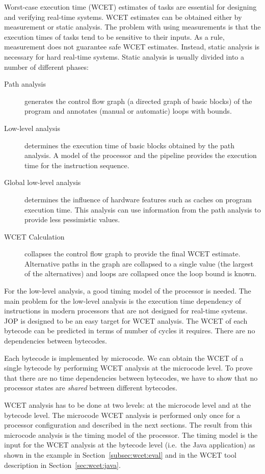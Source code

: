 Worst-case execution time (WCET) estimates of tasks are essential
for designing and verifying real-time systems. WCET estimates can be
obtained either by measurement or static analysis. The problem with
using measurements is that the execution times of tasks tend to be
sensitive to their inputs. As a rule, measurement does not guarantee
safe WCET estimates. Instead, static analysis is necessary for hard
real-time systems. Static analysis is usually divided into a number
of different phases:
\begin{description}
    \item[Path analysis] generates the control flow graph (a directed
    graph of basic blocks) of the program and annotates (manual or
    automatic) loops with bounds.
    \item[Low-level analysis] determines the execution time of basic
    blocks obtained by the path analysis. A model of the processor
    and the pipeline provides the execution time for the instruction
    sequence.
    \item[Global low-level analysis] determines the influence of
    hardware features such as caches on program execution time. This
    analysis can use information from the path analysis to provide less
    pessimistic values.
    \item[WCET Calculation] collapses the control flow graph to
    provide the final WCET estimate. Alternative paths in the graph
    are collapsed to a single value (the largest of the alternatives)
    and loops are collapsed once the loop bound is known.
\end{description}

For the low-level analysis, a good timing model of the processor is
needed. The main problem for the low-level analysis is the execution
time dependency of instructions in modern processors that are not
designed for real-time systems. JOP is designed to be an easy target
for WCET analysis. The WCET of each bytecode can be predicted in
terms of number of cycles it requires. There are no dependencies
between bytecodes.

Each bytecode is implemented by microcode. We can obtain the WCET of
a single bytecode by performing WCET analysis at the microcode
level. To prove that there are no time dependencies between
bytecodes, we have to show that no processor states are
\emph{shared} between different bytecodes.

WCET analysis has to be done at two levels: at the microcode level
and at the bytecode level. The microcode WCET analysis is performed
only once for a processor configuration and described in the next
sections. The result from this microcode analysis is the timing
model of the  processor. The timing model is the input for the WCET
analysis at the bytecode level (i.e.\ the Java application) as shown
in the example in Section~\ref{subsec:wcet:eval} and in the WCET
tool description in Section~\ref{sec:wcet:java}.


